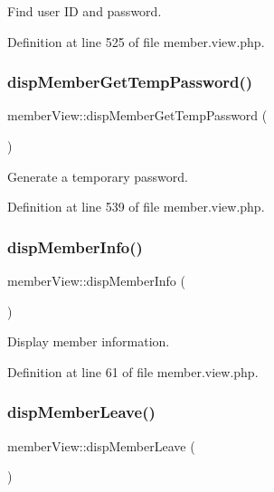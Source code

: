 Find user ID and password. 



Definition at line 525 of file member.\+view.\+php.

\hypertarget{classmemberView_a60b995873557682a5019b8676ce65275}{}\label{classmemberView_a60b995873557682a5019b8676ce65275} 
\subsubsection{\texorpdfstring{disp\+Member\+Get\+Temp\+Password()}{dispMemberGetTempPassword()}}
{\footnotesize\ttfamily member\+View\+::disp\+Member\+Get\+Temp\+Password (\begin{DoxyParamCaption}{ }\end{DoxyParamCaption})}



Generate a temporary password. 



Definition at line 539 of file member.\+view.\+php.

\hypertarget{classmemberView_a81e424307992bdf56ca588e8d1a84995}{}\label{classmemberView_a81e424307992bdf56ca588e8d1a84995} 
\subsubsection{\texorpdfstring{disp\+Member\+Info()}{dispMemberInfo()}}
{\footnotesize\ttfamily member\+View\+::disp\+Member\+Info (\begin{DoxyParamCaption}{ }\end{DoxyParamCaption})}



Display member information. 



Definition at line 61 of file member.\+view.\+php.

\hypertarget{classmemberView_a804df0ce30b1cad33f15c8a34df46929}{}\label{classmemberView_a804df0ce30b1cad33f15c8a34df46929} 
\subsubsection{\texorpdfstring{disp\+Member\+Leave()}{dispMemberLeave()}}
{\footnotesize\ttfamily member\+View\+::disp\+Member\+Leave (\begin{DoxyParamCaption}{ }\end{DoxyParamCaption})}



